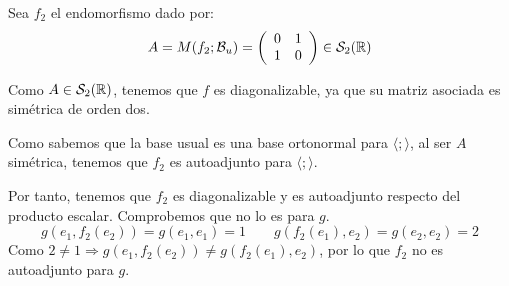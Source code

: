 \begin{ejercicio}
\begin{enumerate}
    Sea $f_2$ el endomorfismo dado por:
    \begin{equation*}
        A=M(f_2;\mathcal{B}_u)=\left(\begin{array}{cc}
        0 & 1 \\
        1 & 0
    \end{array}\right) \in \mathcal{S}_2(\mathbb{R})
    \end{equation*}

    Como $A\in \mathcal{S}_2(\mathbb{R})$, tenemos que $f$ es diagonalizable, ya que su matriz asociada es simétrica de orden dos.
    
    Como sabemos que la base usual es una base ortonormal para $\langle;\rangle$, al ser $A$ simétrica, tenemos que $f_2$ es autoadjunto para $\langle;\rangle$.

    Por tanto, tenemos que $f_2$ es diagonalizable y es autoadjunto respecto del producto escalar. Comprobemos que no lo es para $g$.
    \begin{equation*}
        g(e_1, f_2(e_2))=g(e_1, e_1)=1
        \qquad
        g(f_2(e_1), e_2)=g(e_2, e_2)=2
    \end{equation*}
    Como $2\neq 1 \Longrightarrow g(e_1, f_2(e_2))\neq g(f_2(e_1), e_2)$, por lo que $f_2$ no es autoadjunto para $g$.
    
\end{enumerate}
    
\end{ejercicio}



